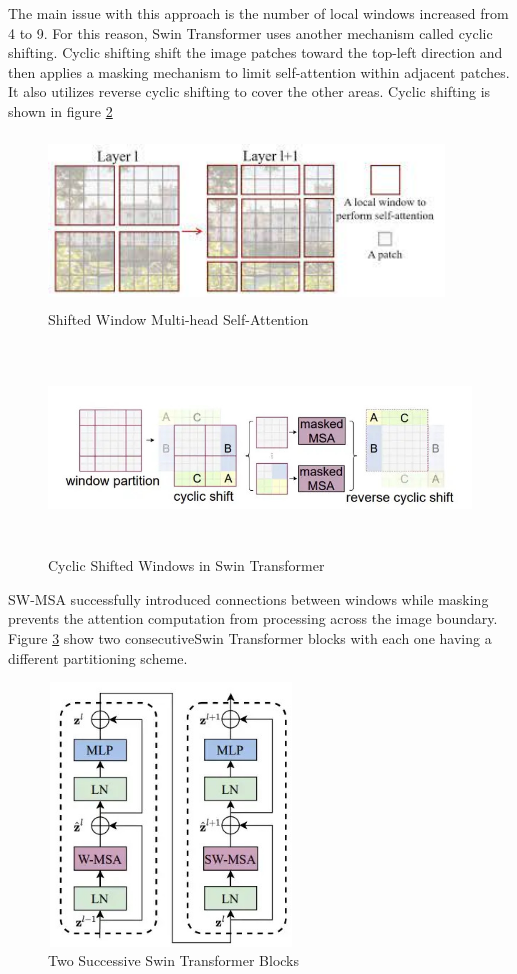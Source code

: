 The main issue with this approach is the number of local windows increased from 4 to 9. For this reason, Swin Transformer uses another mechanism called cyclic shifting. Cyclic shifting shift the image patches toward the top-left direction and then applies a masking mechanism to limit self-attention within adjacent patches. It also utilizes reverse cyclic shifting to cover the other areas. Cyclic shifting is shown in figure \ref{fig:swin cyclic}
\begin{figure}[ht]
\includegraphics[width=10.5cm, height=4.5cm]{images/swin-msa1.jpeg}
\centering
\caption{Shifted Window Multi-head Self-Attention}
\label{fig:swin cyclic}
\end{figure}

\begin{figure}[ht]
\includegraphics[width=13.5cm, height=5.5cm]{images/swin-cyclic-shift.jpg}
\centering
\caption{Cyclic Shifted Windows in Swin Transformer}
\label{fig:swin cyclic}
\end{figure}

SW-MSA successfully introduced connections between windows while masking prevents the attention computation from processing across the image boundary. Figure \ref{fig:2swins} show two consecutiveSwin Transformer blocks with each one having a different partitioning scheme.
\FloatBarrier
\begin{figure}[ht]
\includegraphics[width=6.5cm, height=7cm]{images/swin-architecture.jpg}
\centering
\caption{Two Successive Swin Transformer Blocks}
\label{fig:2swins}
\end{figure}

